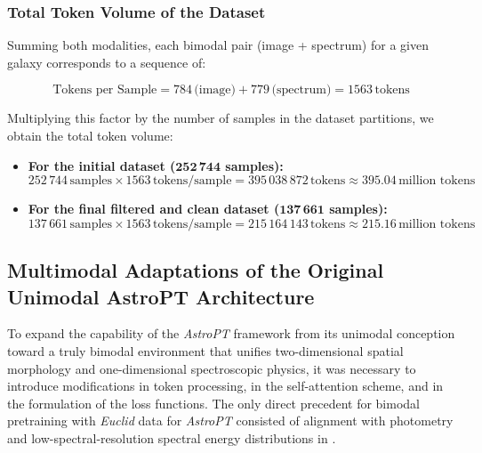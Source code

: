 \subsubsection{Total Token Volume of the Dataset}

Summing both modalities, each bimodal pair (image + spectrum) for a given galaxy corresponds to a sequence of:

\begin{equation}
\text{Tokens per Sample} = 784\,\text{(image)} + 779\,\text{(spectrum)} = 1563\,\text{tokens}
\label{eq:tokens_por_muestra}
\end{equation}

Multiplying this factor by the number of samples in the dataset partitions, we obtain the total token volume:

\begin{itemize}
\item \textbf{For the initial dataset ($\mathbf{252\,744}$ samples):}
    \begin{equation}
    252\,744\,\text{samples} \times 1563\,\text{tokens/sample} = 395\,038\,872\,\text{tokens} \approx 395.04\,\text{million tokens}
    \label{eq:tokens_total_inicial}
    \end{equation}
\item \textbf{For the final filtered and clean dataset ($\mathbf{137\,661}$ samples):}
    \begin{equation}
    137\,661\,\text{samples} \times 1563\,\text{tokens/sample} = 215\,164\,143\,\text{tokens} \approx 215.16\,\text{million tokens}
    \label{eq:tokens_total_final}
    \end{equation}
\end{itemize}

\subsection{Multimodal Adaptations of the Original Unimodal AstroPT Architecture} \label{sec:dev:arch}


To expand the capability of the \textit{AstroPT} framework from its unimodal conception \autocite{ar:astropt} toward a truly bimodal environment that unifies two-dimensional spatial morphology and one-dimensional spectroscopic physics, it was necessary to introduce modifications in token processing, in the self-attention scheme, and in the formulation of the loss functions. The only direct precedent for bimodal pretraining with \textit{Euclid} data for \textit{AstroPT} consisted of alignment with photometry and low-spectral-resolution spectral energy distributions in \textcite{ar:siudek-2025}.

